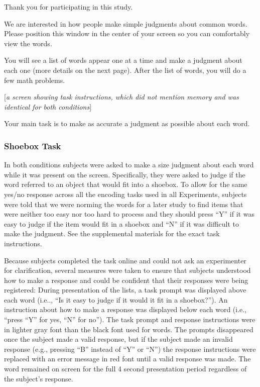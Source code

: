 \documentclass[jou,natbib]{apa6} %
\begin{document}
\begin{displayquote}
        Thank you for participating in this study.

        We are interested in how people make simple judgments about common words.
        Please position this window in the center of your screen so you can comfortably view the words.

        You will see a list of words appear one at a time and make a judgment about each one
        (more details on the next page). After the list of words, you will do a few math problems.
        
        [\textit{a screen showing task instructions, which did not mention memory and was identical for both conditions}]

        Your main task is to make as accurate a judgment as possible about each word.
\end{displayquote}

\subsubsection{Shoebox Task} In both conditions subjects were asked to make a size judgment about each word while it was present on the screen. Specifically, they were asked  to judge if the word referred to an object that would fit into a shoebox. To allow for the same yes/no response across all the encoding tasks used in all Experiments, subjects were told that we were norming the words for a later study to find items that were neither too easy nor too hard to process and they should press ``Y'' if it was easy to judge if the item would fit in a shoebox and ``N'' if it was difficult to make the judgment. See the supplemental materials for the exact task instructions.

Because subjects completed the task online and could not ask an experimenter for clarification, several measures were taken to ensure that subjects understood how to make a response and could be confident that their responses were being registered: During presentation of the lists, a task prompt was displayed above each word (i.e.., ``Is it easy to judge if it would it fit in a shoebox?''). An instruction about how to make a response was displayed below each word (i.e., ``press ``Y'' for yes, ``N'' for no''). The task prompt and response instructions were in lighter gray font than the black font used for words. The prompts disappeared once the subject made a valid response, but if the subject made an invalid response (e.g., pressing ``B'' instead of ``Y'' or ``N'') the response instructions were replaced with an error message in red font until a valid response was made. The word remained on screen for the full 4 second presentation period regardless of the subject's response.
\end{document}
